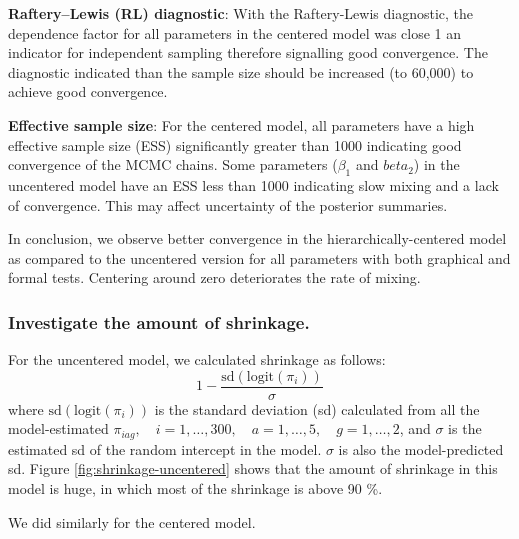 \documentclass[12pt]{article}
\begin{document}
\textbf{Raftery–Lewis (RL) diagnostic}: With the  Raftery-Lewis diagnostic, the dependence factor for all parameters in the centered model was close 1 an indicator for independent sampling therefore signalling good convergence. The diagnostic indicated than the sample size should be increased (to 60,000) to achieve good convergence. 

\textbf{Effective sample size}: For the centered model, all parameters have a high effective sample size (ESS) significantly greater than 1000 indicating good convergence of the MCMC chains. Some parameters ($\beta_1$ and $beta_2$) in the uncentered model have an ESS less than 1000 indicating slow mixing and a lack of convergence. This may affect uncertainty of the posterior summaries. 


In conclusion, we observe better convergence in the hierarchically-centered model as compared to the uncentered version for all parameters with both  graphical and formal tests. Centering around zero deteriorates the rate of mixing. %

\subsubsection{Investigate the amount of shrinkage.}

For the uncentered model, we calculated shrinkage as follows:
\[
1 - \frac{\text{sd}(\text{logit}(\pi_i))}{\sigma}
\]
where \( \text{sd}(\text{logit}(\pi_i)) \) is the standard deviation (sd) calculated from all the model-estimated \( \pi_{iag}, \quad i = 1, \dots, 300, \quad a = 1, \dots, 5, \quad g = 1, \dots, 2 \), and \( \sigma \) is the estimated sd of the random intercept in the model. \( \sigma \) is also the model-predicted sd. Figure \ref{fig:shrinkage-uncentered} shows that the amount of shrinkage in this model is huge, in which most of the shrinkage is above 90 \%.

We did similarly for the centered model.
\end{document}

